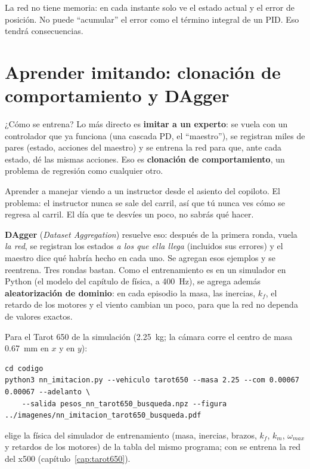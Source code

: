 \begin{recuerda}
La red no tiene memoria: en cada instante solo ve el estado actual y el error de posición. No puede
``acumular'' el error como el término integral de un PID. Eso tendrá consecuencias.
\end{recuerda}

\section{Aprender imitando: clonación de comportamiento y DAgger}

¿Cómo se entrena? Lo más directo es \textbf{imitar a un experto}: se vuela con un controlador que ya
funciona (una cascada PD, el ``maestro''), se registran miles de pares (estado, acciones del maestro) y
se entrena la red para que, ante cada estado, dé las mismas acciones. Eso es \textbf{clonación de
comportamiento}, un problema de regresión como cualquier otro.

\begin{ejemplo}
Aprender a manejar viendo a un instructor desde el asiento del copiloto. El problema: el instructor
nunca se sale del carril, así que tú nunca ves cómo se regresa al carril. El día que te desvíes un poco,
no sabrás qué hacer.
\end{ejemplo}

\textbf{DAgger} (\emph{Dataset Aggregation}) resuelve eso: después de la primera ronda, vuela \emph{la
red}, se registran los estados \emph{a los que ella llega} (incluidos sus errores) y el maestro dice qué
habría hecho en cada uno. Se agregan esos ejemplos y se reentrena. Tres rondas bastan. Como el
entrenamiento es en un simulador en Python (el modelo del capítulo de física, a 400~Hz), se agrega
además \textbf{aleatorización de dominio}: en cada episodio la masa, las inercias, $k_f$, el retardo de
los motores y el viento cambian un poco, para que la red no dependa de valores exactos.

Para el Tarot 650 de la simulación (2.25~kg; la cámara corre el centro de masa 0.67~mm en $x$ y en $y$):
\begin{lstlisting}[style=bash]
cd codigo
python3 nn_imitacion.py --vehiculo tarot650 --masa 2.25 --com 0.00067 0.00067 --adelanto \
    --salida pesos_nn_tarot650_busqueda.npz --figura ../imagenes/nn_imitacion_tarot650_busqueda.pdf
\end{lstlisting}
 elige la física del simulador de entrenamiento (masa, inercias, brazos, $k_f$, $k_m$,
$\omega_{max}$ y retardos de los motores) de la tabla \cod{VEHICULOS} del mismo programa; con
\cod{--vehiculo x500} se entrena la red del x500 (capítulo~\ref{cap:tarot650}).

